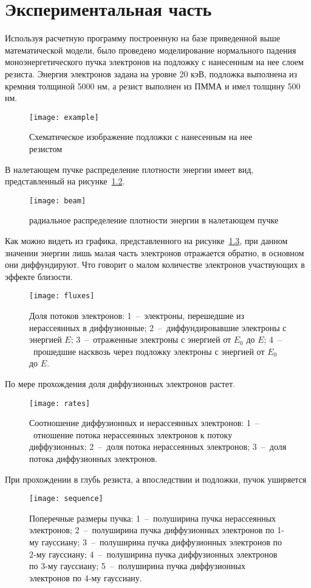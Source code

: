 \chapter{Экспериментальная часть}
Используя расчетную программу построенную на базе приведенной выше математической модели, было проведено моделирование нормального падения моноэнергетического пучка электронов на подложку с нанесенным на нее слоем резиста. Энергия электронов задана на уровне 20 кэВ, подложка выполнена из кремния толщиной 5000 нм, а резист выполнен из ПММА и имел толщину 500 нм.

\begin{figure}[h]
    \center
    \texttt{[image: example]}
    \caption{Схематическое изображение подложки с нанесенным на нее резистом}
    \label{fig:example}
\end{figure}
В налетающем пучке распределение плотности энергии имеет вид, представленный на рисунке~\ref{fig:beam}.
\begin{figure}[h]
    \center
    \texttt{[image: beam]}
    \caption{радиальное распределение плотности энергии в налетающем пучке}
    \label{fig:beam}
\end{figure}

Как можно видеть из графика, представленного на рисунке~\ref{fig:fluxes}, при данном значении энергии лишь малая часть электронов отражается обратно, в основном они диффундируют. Что говорит о малом количестве электронов участвующих в эффекте близости.
\begin{figure}[h]
    \center
    \texttt{[image: fluxes]}
    \caption{Доля потоков электронов:
    1~--~электроны, перешедшие из нерассеянных в диффузионные;
2~--~диффундировавшие электроны с энергией $E$;
3~--~отраженные электроны с энергией от $E_0$ до $E$;
4~--~прошедшие насквозь через подложку электроны с энергией от $E_0$ до $E$.
}
    \label{fig:fluxes}
\end{figure}

По мере прохождения доля диффузионных электронов растет.
\begin{figure}[h]
    \center
    \texttt{[image: rates]}
    \caption{Соотношение диффузионных и нерассеянных электронов: 1~--~отношение потока нерассеянных электронов к потоку диффузионных;
2~--~доля потока нерассеянных электронов;
3~--~доля потока диффузионных электронов.
}
    \label{fig:rates}
\end{figure}
При прохождении в глубь резиста, а впоследствии и подложки, пучок уширяется
\begin{figure}[h]
    \center
    \texttt{[image: sequence]}
    \caption{Поперечные размеры пучка:
1~--~полуширина пучка нерассеянных электронов;
2~--~полуширина пучка диффузионных электронов по 1-му гауссиану;
3~--~полуширина пучка диффузионных электронов по 2-му гауссиану;
4~--~полуширина пучка диффузионных электронов по 3-му гауссиану;
5~--~полуширина пучка диффузионных электронов по 4-му гауссиану.}
    \label{fig:sequence}
\end{figure}

